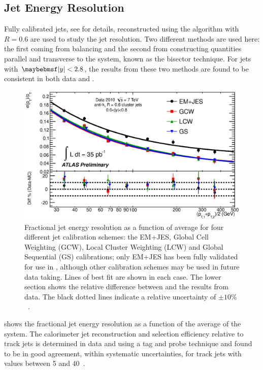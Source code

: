 \subsection{Jet Energy Resolution}
\label{sec:detector:jer}
Fully calibrated jets, see  for
details, reconstructed using the \akt algorithm with $R=0.6$ are used to study
the jet resolution. Two different methods are used here: the first coming from \dijet
\pT balancing and the second from constructing quantities parallel and transverse
to the \dijet system, known as the bisector technique. For jets with $\absRap < 2.8$,
the results from these two methods are found to be consistent in both data and \MC. 

\begin{figure}[htpb]
  \includegraphics[width=\largefigwidth]{chapters/detector/JERDiffJESDataMC.0.6.eps}
  \caption{Fractional jet energy resolution as a function of average \dijet \pT
           for four different jet calibration schemes: the EM+JES, Global Cell Weighting
           (GCW), Local Cluster Weighting (LCW) and Global Sequential (GS) calibrations;
           only EM+JES has been fully validated for use in \ATLAS, although other
           calibration schemes may be used in future data taking. Lines of best
           fit are shown in each case. The lower section shows the relative difference
           between \MC and the results from data. The black dotted lines indicate
           a relative uncertainty of $\pm10\%$~\cite{ATLAS-CONF-2010-054}.}
  \label{fig:detector:jer}
\end{figure}

 shows the fractional jet energy resolution as
a function of the average \pT of the \dijet system.  The calorimeter jet reconstruction
and selection efficiency relative to track jets is determined in data and \MC using
a tag and probe technique and found to be in good agreement, within systematic uncertainties,
for track jets with \pT values between 5 and \unit{40}{\GeV}~\cite{ATLAS-CONF-2010-054}.

